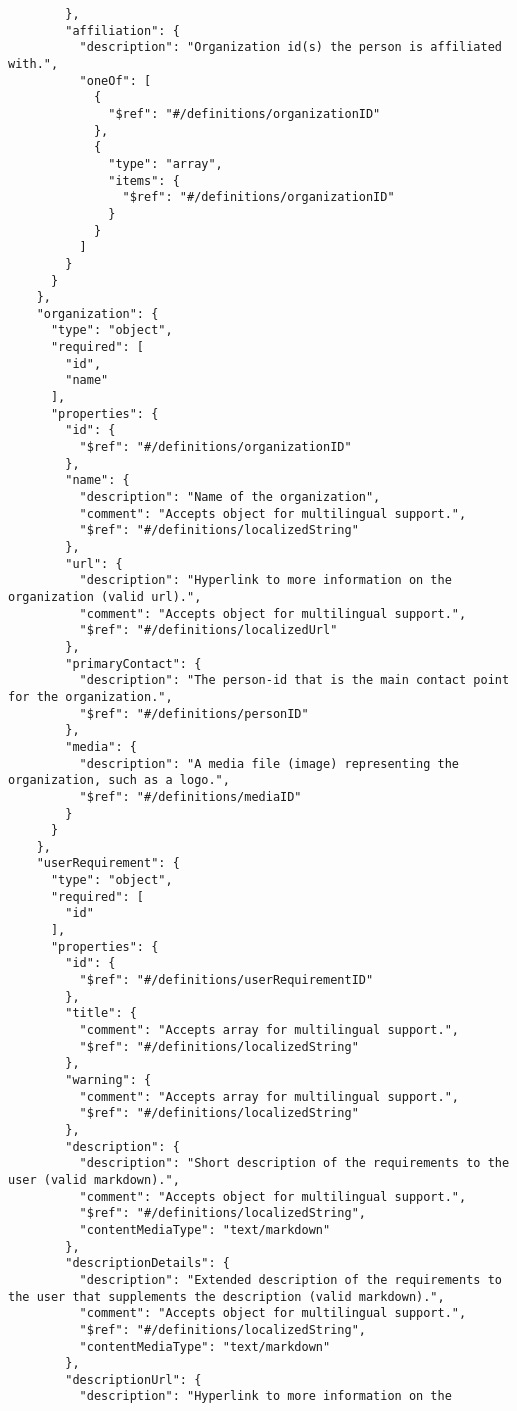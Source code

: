 \documentclass[10pt,letterpaper]{article}
\begin{document}
\begin{verbatim}
        },
        "affiliation": {
          "description": "Organization id(s) the person is affiliated
with.",
          "oneOf": [
            {
              "$ref": "#/definitions/organizationID"
            },
            {
              "type": "array",
              "items": {
                "$ref": "#/definitions/organizationID"
              }
            }
          ]
        }
      }
    },
    "organization": {
      "type": "object",
      "required": [
        "id",
        "name"
      ],
      "properties": {
        "id": {
          "$ref": "#/definitions/organizationID"
        },
        "name": {
          "description": "Name of the organization",
          "comment": "Accepts object for multilingual support.",
          "$ref": "#/definitions/localizedString"
        },
        "url": {
          "description": "Hyperlink to more information on the
organization (valid url).",
          "comment": "Accepts object for multilingual support.",
          "$ref": "#/definitions/localizedUrl"
        },
        "primaryContact": {
          "description": "The person-id that is the main contact point
for the organization.",
          "$ref": "#/definitions/personID"
        },
        "media": {
          "description": "A media file (image) representing the
organization, such as a logo.",
          "$ref": "#/definitions/mediaID"
        }
      }
    },
    "userRequirement": {
      "type": "object",
      "required": [
        "id"
      ],
      "properties": {
        "id": {
          "$ref": "#/definitions/userRequirementID"
        },
        "title": {
          "comment": "Accepts array for multilingual support.",
          "$ref": "#/definitions/localizedString"
        },
        "warning": {
          "comment": "Accepts array for multilingual support.",
          "$ref": "#/definitions/localizedString"
        },
        "description": {
          "description": "Short description of the requirements to the
user (valid markdown).",
          "comment": "Accepts object for multilingual support.",
          "$ref": "#/definitions/localizedString",
          "contentMediaType": "text/markdown"
        },
        "descriptionDetails": {
          "description": "Extended description of the requirements to
the user that supplements the description (valid markdown).",
          "comment": "Accepts object for multilingual support.",
          "$ref": "#/definitions/localizedString",
          "contentMediaType": "text/markdown"
        },
        "descriptionUrl": {
          "description": "Hyperlink to more information on the

\end{verbatim}
\end{document}
